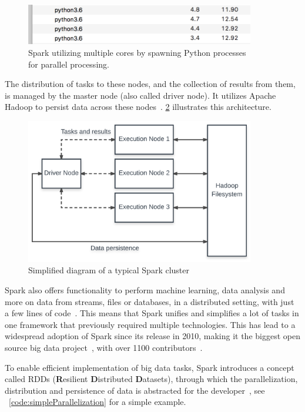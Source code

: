 \begin{figure}
    \centering
    \caption{Spark utilizing multiple cores by spawning Python processes \\for parallel processing.}
    \label{fig:spark_processes}
    \includegraphics[width=10cm]{../images/python_processes.png}
\end{figure}

The distribution of tasks to these nodes, and the collection of results from them,
is managed by the master node (also called driver node).
It utilizes Apache Hadoop to persist data across these nodes~\cite{Zaharia2016}.
\ref{fig:spark} illustrates this architecture.

\begin{figure}
    \centering
    \caption{Simplified diagram of a typical Spark cluster}
    \label{fig:spark}
    \includegraphics[width=10cm]{../figures/spark.pdf}
\end{figure}

\par
Spark also offers functionality to perform machine learning, data analysis and more on data from streams,
files or databases, in a distributed setting, with just a few lines of code~\cite{sparkDocs}.
This means that Spark unifies and simplifies a lot of tasks in one framework that previously required multiple technologies.
This has lead to a widespread adoption of Spark since its release in 2010,
making it the biggest open source big data project~\cite{Zaharia2016}, with over 1100 contributors~\cite{sparkContributor}.

\par
To enable efficient implementation of big data tasks, Spark introduces a concept called RDDs
(\textbf{R}esilient \textbf{D}istributed \textbf{D}atasets),
through which the parallelization, distribution and persistence of data is abstracted for the developer~\cite{sparkDocs},
see ~\ref{code:simpleParallelization} for a simple example.

